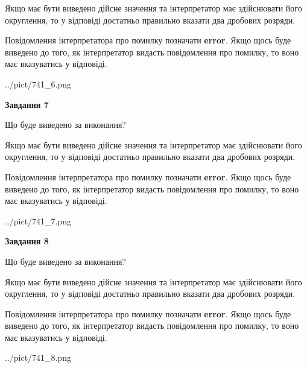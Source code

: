 \documentclass[12pt, ukrainian]{article}
\begin{document}
{\begin {Large}
Якщо має бути виведено дійсне значення та інтерпретатор має здійснювати його округлення, 
то у відповіді достатньо правильно вказати два дробових розряди.

Повідомлення інтерпретатора про помилку позначати \textbf{error}.
Якщо щось буде виведено до того, як інтерпретатор видасть повідомлення про помилку, 
то воно має вказуватись у відповіді. \par

\begin{center}
	{../pict/741_6.png}
\end{center}
\newpage

{\begin {center}\textbf{Завдання 7}\end {center}}\par
Що буде виведено за виконання? \par

Якщо має бути виведено дійсне значення та інтерпретатор має здійснювати його округлення, 
то у відповіді достатньо правильно вказати два дробових розряди.

Повідомлення інтерпретатора про помилку позначати \textbf{error}.
Якщо щось буде виведено до того, як інтерпретатор видасть повідомлення про помилку, 
то воно має вказуватись у відповіді. \par

\begin{center}
	{../pict/741_7.png}
\end{center}
\newpage

{\begin {center}\textbf{Завдання 8}\end {center}}\par
Що буде виведено за виконання? \par

Якщо має бути виведено дійсне значення та інтерпретатор має здійснювати його округлення, 
то у відповіді достатньо правильно вказати два дробових розряди.

Повідомлення інтерпретатора про помилку позначати \textbf{error}.
Якщо щось буде виведено до того, як інтерпретатор видасть повідомлення про помилку, 
то воно має вказуватись у відповіді. \par

\begin{center}
	{../pict/741_8.png}
\end{center}
\newpage


\end{Large}}
\end{document}
